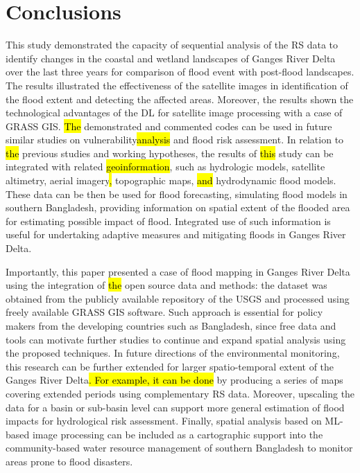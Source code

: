 \documentclass[water,article,submit,pdftex,moreauthors]{Definitions/mdpi}
\begin{document}
\section{Conclusions}
This study demonstrated the capacity of sequential analysis of the RS data to identify changes in the coastal and wetland landscapes of Ganges River Delta over the last three years\hl{ }for comparison of flood event with post-flood landscapes. The results illustrated the effectiveness of the satellite images in identification of the flood extent and detecting the affected areas. Moreover, the results shown the technological advantages of the DL for satellite image processing with a case of GRASS GIS. \hl{The} demonstrated and commented codes can be used in future similar studies on vulnerability\hl{analysis} and flood risk assessment. In relation to \hl{the} previous studies and\hl{ }working hypotheses, the results of \hl{this} study can be integrated with related \hl{geoinformation}, such as hydrologic models, satellite altimetry, aerial imagery\hl{,} topographic maps, \hl{and }hydrodynamic flood models. These data can be then be used for flood forecasting, simulating flood models in southern Bangladesh, providing information on spatial extent of the flooded area for estimating possible impact of flood. Integrated use of such information is useful  for undertaking adaptive measures and mitigating floods in Ganges River Delta.

Importantly, this paper presented a case of flood mapping in Ganges River Delta using the integration of \hl{the} open source data and methods: the dataset was obtained from the publicly available repository of the USGS and processed using freely available GRASS GIS software. Such approach is essential for\hl{ }policy makers from the developing countries such as Bangladesh, since free data and tools can motivate further studies to continue and expand spatial analysis using the proposed techniques. In future directions of the environmental monitoring, this research can be further extended for larger spatio-temporal extent of the Ganges River Delta\hl{. For example, it can be done }by producing a series of maps covering extended periods using complementary RS data. Moreover, upscaling the data for a basin or sub-basin level can support more general estimation of flood impacts for hydrological risk assessment. Finally, spatial analysis based on ML-based image processing can be included as a cartographic support into the community-based water resource management of southern Bangladesh to monitor areas prone to flood disasters.
\end{document}
